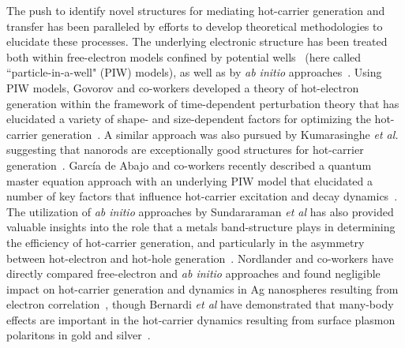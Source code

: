 \documentclass[journal=jpclcd,manuscript=letter]{achemso}
\begin{document}
The push to identify novel structures for mediating hot-carrier generation and transfer has been paralleled by 
efforts to develop theoretical methodologies to elucidate these processes.  The underlying electronic
structure has been treated both within free-electron models confined by potential wells~\cite{GZG_JPCC_2013,ZG_JPCC_2014,MLK_ACSNano_2014,KPB_SciRep_2015,SAG_ACSPhotonics_2016} (here called
``particle-in-a-well" (PIW) models), as well as by {\it ab initio} approaches~\cite{SNJ_NatComm_2014,BMN_NatComm_2015,MWW_NatComm_2015,BSN_ACSNano_2016}.
Using PIW models, Govorov and co-workers developed a theory of 
hot-electron generation within the framework of time-dependent perturbation theory that
has elucidated a variety of shape- and size-dependent factors for optimizing 
the hot-carrier generation~\cite{GZG_JPCC_2013,ZG_JPCC_2014}.  A similar approach was also pursued by Kumarasinghe {\it et al.} suggesting
that nanorods are exceptionally good structures for hot-carrier generation~\cite{KPB_SciRep_2015}.  Garc\'ia de Abajo and co-workers recently described a 
quantum master equation approach with an underlying PIW model that elucidated a number of key factors that influence
hot-carrier excitation and decay dynamics~\cite{SAG_ACSPhotonics_2016}.  The utilization of {\it ab initio} approaches by Sundararaman {\it et al} 
has also provided valuable insights into the role that a metals band-structure plays
in determining the efficiency of hot-carrier generation, and particularly in the asymmetry between hot-electron
and hot-hole generation~\cite{SNJ_NatComm_2014}.  Nordlander and co-workers have directly compared free-electron and {\it ab initio} approaches
and found negligible impact on hot-carrier generation and dynamics in Ag nanospheres resulting from electron correlation~\cite{MLK_ACSNano_2014}, 
though Bernardi {\it et al} have demonstrated that many-body effects are important in the hot-carrier dynamics resulting
from surface plasmon polaritons in gold and silver~\cite{BMN_NatComm_2015}.
\end{document}
